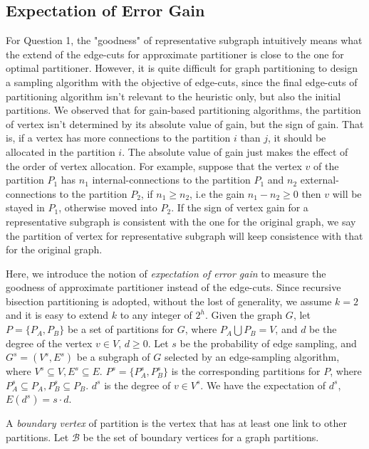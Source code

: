\documentclass{sig-alternate-2013}
\begin{document}
\subsection{Expectation of Error Gain}
For Question 1, the "goodness" of representative subgraph intuitively means what the extend of the edge-cuts for approximate partitioner is close to the one for optimal partitioner. However, it is quite difficult for graph partitioning to design a sampling algorithm with the objective of edge-cuts, since the final edge-cuts of partitioning algorithm isn't relevant to the heuristic only, but also the initial partitions.
We observed that for gain-based partitioning algorithms, the partition of vertex isn't determined by its absolute value of gain, but the sign of gain. That is, if a vertex has more connections to the partition $i$ than $j$, it should be allocated in the partition $i$. The absolute value of gain just makes the effect of the order of vertex allocation.
For example, suppose that the vertex $v$ of the partition $P_1$ has $n_1$ internal-connections to the partition $P_1$ and $n_2$ external-connections to the partition $P_2$, if $n_1\geq n_2$, i.e the gain $n_1 - n_2 \geq 0$ then $v$ will be stayed in $P_1$, otherwise moved into $P_2$. If the sign of vertex gain for a representative subgraph is consistent with the one for the original graph, we say the partition of vertex for representative subgraph will keep consistence with that for the original graph.

Here, we introduce the notion of \textit{expectation of error gain} to measure the goodness of approximate partitioner instead of the edge-cuts.
Since recursive bisection partitioning is adopted, without the lost of generality, we assume $k = 2$ and it is easy to extend $k$ to any integer of $2^h$. 
Given the graph $G$, let $P=\{P_A,P_B\}$ be a set of partitions for $G$, where $P_A \bigcup P_B = V$, and $d$ be the degree of the vertex $v \in V$, $d \geq 0$. 
Let $s$ be the probability of edge sampling, and $G^s = (V^s, E^s)$ be a subgraph of $G$ selected by an edge-sampling algorithm, where $V^s \subseteq V, E^s \subseteq E$. 
$P^s=\{P_A^s,P_B^s\}$ is the corresponding partitions for $P$, where $P_A^s \subseteq P_A, P_B^s \subseteq P_B$. 
$d^s$ is the degree of $v \in V^s$. We have the expectation of $d^s$, $E(d^s) = s\cdot d$.

\begin{definition}\label{def-boundary}
 A \textit{boundary vertex} of partition is the vertex that has at least one link to other partitions. Let $\mathcal{B}$ be the set of boundary vertices for a graph partitions.
\end{definition}
\end{document}
